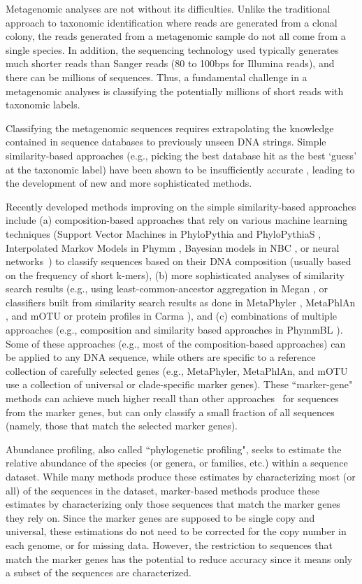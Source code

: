 Metagenomic analyses are not without its difficulties.  Unlike the traditional approach to taxonomic identification where reads are generated from a clonal colony, the reads generated from a metagenomic sample do not all come from a single species.  In addition, the sequencing technology used typically generates much shorter reads than Sanger reads (80 to 100bps for Illumina reads), and there can be millions of sequences.  Thus, a fundamental challenge in a metagenomic analyses is classifying the potentially millions of short reads with taxonomic labels.

Classifying the metagenomic sequences requires
extrapolating the knowledge contained in sequence databases to
previously unseen DNA strings.  Simple similarity-based approaches
(e.g., picking the best database hit as the best `guess' at the
taxonomic label) have been shown to be insufficiently
accurate \cite{closest-blast-hit}, leading to the development of 
new and more sophisticated methods.

Recently developed methods improving
on the simple similarity-based approaches include 
(a) composition-based approaches that rely on
various machine learning techniques 
(Support Vector Machines in
PhyloPythia and PhyloPythiaS \cite{McHardy2007a, Patil2011}, 
Interpolated Markov Models in Phymm 
\cite{Brady2011},
Bayesian models in NBC \cite{Rosen2011}, or neural networks~\cite{SOM2006}) to
classify sequences based on their DNA composition (usually based on
the frequency of short k-mers),
(b)  more sophisticated analyses of
similarity search results (e.g., using least-common-ancestor
aggregation in Megan \cite{Huson2007}, or classifiers built from similarity
search results as done in MetaPhyler \cite{Liu2011d,Liu2011}, 
MetaPhlAn \cite{Segata2012a}, and mOTU \cite{Sunagawa2013}
or protein profiles in Carma \cite{Gerlach2011b}), and
(c) combinations of
multiple approaches (e.g., composition and similarity based approaches
in PhymmBL \cite{Brady2009}).  
Some of these approaches (e.g., most of the
composition-based approaches) can be applied to any DNA sequence,
while others are specific to a reference collection of carefully
selected genes (e.g., MetaPhyler, MetaPhlAn, and mOTU use a collection of
universal or clade-specific marker genes).  These
``marker-gene" methods can
achieve much higher recall than other
approaches~\cite{Liu2011d} for sequences from the marker genes, but 
can only classify a small
fraction of all sequences (namely, those that match the 
selected marker genes). 

Abundance profiling, also called ``phylogenetic profiling", 
seeks to estimate the relative
abundance of the species (or
genera, or families, etc.) within a sequence dataset.
While many methods produce these estimates by characterizing
most (or all) of the sequences in the dataset, marker-based methods
produce these estimates by characterizing only those
sequences that match the marker genes they rely on.
Since the marker genes are supposed to be single
copy and universal, these estimations do not need to
be corrected for the copy number in each genome, or for
missing data. 
However, the restriction to sequences that match the marker genes
has the potential to reduce accuracy since it means only a subset
of the sequences are characterized.

